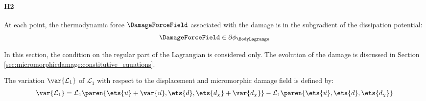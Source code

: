 \paragraph{H2}

At each point, the thermodynamic force $\DamageForceField$ associated with the
damage is in the subgradient of the dissipation potential:
%
%
%
\begin{equation}
  \label{eq:ef_micromorphic:formulation:generalized_standard_0}
  \DamageForceField \in \partial \phi_{\BodyLagrange}
\end{equation}


In this section, the condition on the regular part of
the Lagrangian is considered only.
The evolution of the damage is discussed in Section
\ref{sec:micromorphicdamage:constitutive_equations}.

The variation $\var{\mathcal{L}_{1}}$ of $\mathcal{L}_{1}$ with respect to the
displacement and micromorphic damage field is defined by:
\begin{equation}
  \label{eq:ef_micromorphic:formulation:lagrangian_variation_0}
  \begin{aligned}
    \var{\mathcal{L}_{1}}
    =
    \mathcal{L}_{1}\paren{\ets{\vec{u}}+\var{\vec{u}},\ets{d}, \ets{d_{\chi}} + \var{d_{\chi}}} - 
    \mathcal{L}_{1}\paren{\ets{\vec{u}},\ets{d}, \ets{d_{\chi}}}
  \end{aligned}
\end{equation}

